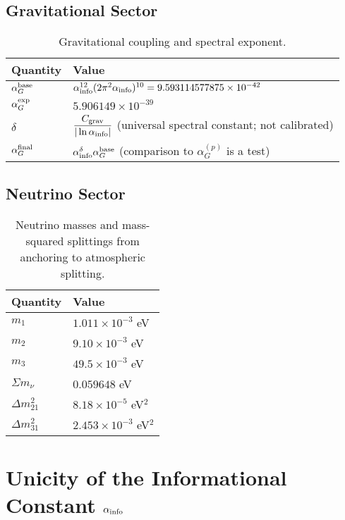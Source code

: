 \documentclass{article}
\numberwithin{equation}{section}
\theoremstyle{plain}
\theoremstyle{definition}
\theoremstyle{remark}
\begin{document}
\subsection{Gravitational Sector}
\begin{table}[H]
\centering
\small
\begin{tabular}{ll}
\toprule
Quantity & Value \\
\midrule
$\alpha_G^{\rm base}$ & $\alpha_{\rm info}^{12}(2\pi^2\alpha_{\rm info})^{10} = 9.593114577875\times10^{-42}$ \\
$\alpha_G^{\rm exp}$ & $5.906149\times10^{-39}$ \\
$\delta$ & $\dfrac{C_{\rm grav}}{|\ln\alpha_{\rm info}|}$ (universal spectral constant; not calibrated) \\
$\alpha_G^{\rm final}$ & $\alpha_{\rm info}^{\delta}\alpha_G^{\rm base}$ (comparison to $\alpha_G^{(p)}$ is a test) \\
\bottomrule
\end{tabular}
\caption{Gravitational coupling and spectral exponent.}
\end{table}

\subsection{Neutrino Sector}
\begin{table}[H]
\centering
\small
\begin{tabular}{ll}
\toprule
Quantity & Value \\
\midrule
$m_1$ & $1.011\times10^{-3}$ eV \\
$m_2$ & $9.10\times10^{-3}$ eV \\
$m_3$ & $49.5\times10^{-3}$ eV \\
$\Sigma m_\nu$ & $0.059648$ eV \\
$\Delta m_{21}^2$ & $8.18\times10^{-5}$ eV$^2$ \\
$\Delta m_{31}^2$ & $2.453\times10^{-3}$ eV$^2$ \\
\bottomrule
\end{tabular}
\caption{Neutrino masses and mass-squared splittings from anchoring to atmospheric splitting.}
\end{table}

\section{Unicity of the Informational Constant \texorpdfstring{$\alpha_{\rm info}$}{α\_info}}
\label{app:ainfo}
\end{document}
